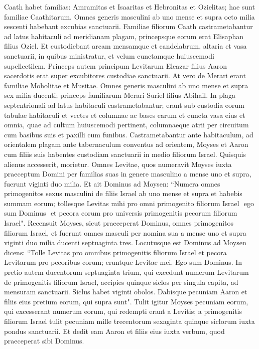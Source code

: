 \begin{biblechapter}
\verse Caath habet familias: Amramitas et Isaaritas et Hebronitas et Ozielitas; hae sunt familiae Caathitarum. 
\verse Omnes generis masculini ab uno mense et supra octo milia sescenti habebant excubias sanctuarii. 
\verse Familiae filiorum Caath castrametabantur ad latus habitaculi ad meridianam plagam, 
\verse princepsque eorum erat Elisaphan filius Oziel. 
\verse Et custodiebant arcam mensamque et candelabrum, altaria et vasa sanctuarii, in quibus ministratur, et velum cunctamque huiuscemodi supellectilem. 
\verse Princeps autem principum Levitarum Eleazar filius Aaron sacerdotis erat super excubitores custodiae sanctuarii. 
\verse At vero de Merari erant familiae Moholitae et Musitae. 
\verse Omnes generis masculini ab uno mense et supra sex milia ducenti; 
\verse princeps familiarum Merari Suriel filius Abihail. In plaga septentrionali ad latus habitaculi castrametabantur; 
\verse erant sub custodia eorum tabulae habitaculi et vectes et columnae ac bases earum et cuncta vasa eius et omnia, quae ad cultum huiuscemodi pertinent, 
\verse columnaeque atrii per circuitum cum basibus suis et paxilli cum funibus. 
\verse Castrametabantur ante habitaculum, ad orientalem plagam ante tabernaculum conventus ad orientem, Moyses et Aaron cum filiis suis habentes custodiam sanctuarii in medio filiorum Israel. Quisquis alienus accesserit, morietur. 
\verse Omnes Levitae, quos numeravit Moyses iuxta praeceptum Domini per familias suas in genere masculino a mense uno et supra, fuerunt viginti duo milia. 
\verse Et ait Dominus ad Moysen: “Numera omnes primogenitos sexus masculini de filiis Israel ab uno mense et supra et habebis summam eorum; 
\verse tollesque Levitas mihi pro omni primogenito filiorum Israel ­ ego sum Dominus ­ et pecora eorum pro universis primogenitis pecorum filiorum Israel". 
\verse Recensuit Moyses, sicut praeceperat Dominus, omnes primogenitos filiorum Israel, 
\verse et fuerunt omnes masculi per nomina sua a mense uno et supra viginti duo milia ducenti septuaginta tres. 
\verse Locutusque est Dominus ad Moysen dicens: 
\verse “Tolle Levitas pro omnibus primogenitis filiorum Israel et pecora Levitarum pro pecoribus corum; eruntque Levitae mei. Ego sum Dominus. 
\verse In pretio autem ducentorum septuaginta trium, qui excedunt numerum Levitarum de primogenitis filiorum Israel, 
\verse accipies quinque siclos per singula capita, ad mensuram sanctuarii. Siclus habet viginti obolos. 
\verse Dabisque pecuniam Aaron et filiis eius pretium eorum, qui supra sunt". 
\verse Tulit igitur Moyses pecuniam eorum, qui excesserant numerum eorum, qui redempti erant a Levitis; 
\verse a primogenitis filiorum Israel tulit pecuniam mille trecentorum sexaginta quinque siclorum iuxta pondus sanctuarii. 
\verse Et dedit eam Aaron et filiis eius iuxta verbum, quod praeceperat sibi Dominus. 
\end{biblechapter}

